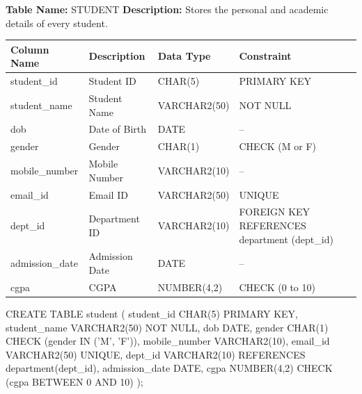 
\textbf{Table Name:} STUDENT \hspace{1em plus 1fill}
\textbf{Description:} Stores the personal and academic details of every student.

\vspace{8pt}

\renewcommand{\arraystretch}{1.4}
\begin{tabularx}{\textwidth}{|>{\raggedright\arraybackslash}X|>{\raggedright\arraybackslash}X|>{\raggedright\arraybackslash}X|>{\raggedright\arraybackslash}X|}
\hline
\textbf{Column Name} & \textbf{Description} & \textbf{Data Type} & \textbf{Constraint} \\
\hline
student\_id & Student ID & CHAR(5) & PRIMARY KEY \\
\hline
student\_name & Student Name & VARCHAR2(50) & NOT NULL \\
\hline
dob & Date of Birth & DATE & -- \\
\hline
gender & Gender & CHAR(1) & CHECK (M or F) \\
\hline
mobile\_number & Mobile Number & VARCHAR2(10) & -- \\
\hline
email\_id & Email ID & VARCHAR2(50) & UNIQUE \\
\hline
dept\_id & Department ID & VARCHAR2(10) & FOREIGN KEY REFERENCES department (dept\_id) \\
\hline
admission\_date & Admission Date & DATE & -- \\
\hline
cgpa & CGPA & NUMBER(4,2) & CHECK (0 to 10) \\
\hline
\end{tabularx}

\vspace{14pt}


\begin{sqlcode}
CREATE TABLE student (
    student_id     CHAR(5)       PRIMARY KEY,
    student_name   VARCHAR2(50)  NOT NULL,
    dob            DATE,
    gender         CHAR(1)       CHECK (gender IN ('M', 'F')),
    mobile_number  VARCHAR2(10),
    email_id       VARCHAR2(50)  UNIQUE,
    dept_id        VARCHAR2(10)  REFERENCES department(dept_id),
    admission_date DATE,
    cgpa           NUMBER(4,2)   CHECK (cgpa BETWEEN 0 AND 10)
);
\end{sqlcode}

